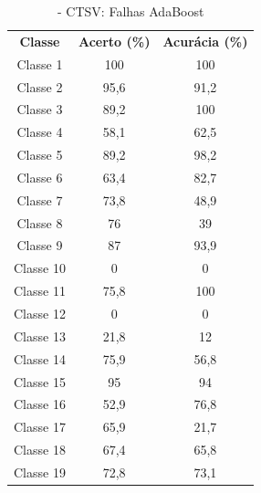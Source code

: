 \begin{itemize}
 \begin{table}[ht]
\centering
\begin{tabular}{ccc}
\textbf{Classe} & \textbf{Acerto (\%)} & \textbf{Acurácia (\%)} \\
Classe 1        & 100                  & 100                    \\
Classe 2        & 95,6                  & 91,2                    \\
Classe 3        & 89,2                  & 100                    \\
Classe 4        & 58,1                  & 62,5                    \\
Classe 5        & 89,2                 & 98,2                    \\
Classe 6        & 63,4                  & 82,7                    \\
Classe 7        & 73,8                  & 48,9                    \\
Classe 8        & 76                  & 39                    \\
Classe 9        & 87                  & 93,9                    \\
Classe 10       & 0                  & 0                    \\
Classe 11       & 75,8            & 100   
     \\
Classe 12       & 0                 & 0   
     \\
Classe 13      & 21,8                 & 12    
     \\
Classe 14       &  75,9                & 56,8   
     \\
Classe 15       & 95                 & 94
     \\
Classe 16       & 52,9                &    76,8
     \\
Classe 17       & 65,9                & 21,7
     \\
Classe 18     &  67,4              &    65,8 
     \\
Classe 19       & 72,8                 & 73,1   
\end{tabular}
\caption{\label{tab:ctsvnAdaBoost}- CTSV: Falhas AdaBoost}
\end{table}



\end{itemize}
